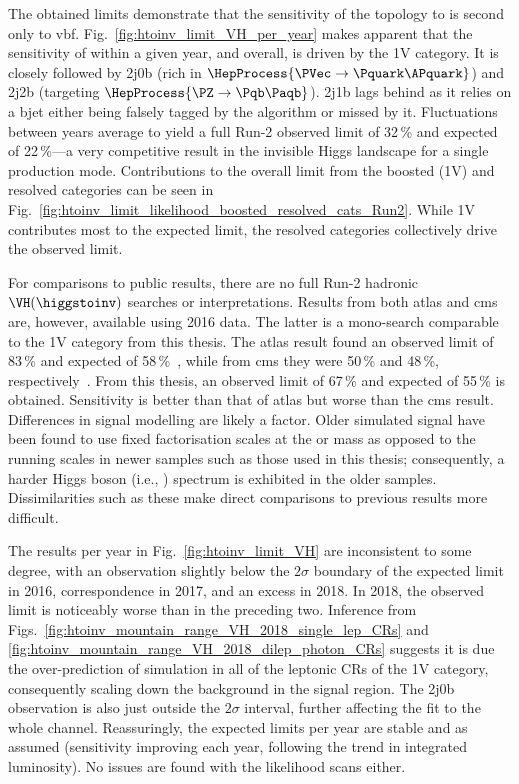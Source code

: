 The obtained limits demonstrate that the sensitivity of the \VH topology to \higgstoinv is second only to \acrshort{vbf}. Fig.~\ref{fig:htoinv_limit_VH_per_year} makes apparent that the sensitivity of \VH within a given year, and overall, is driven by the 1V category. It is closely followed by 2j0b (rich in $\HepProcess{\PVec \to \Pquark\APquark}$) and 2j2b (targeting $\HepProcess{\PZ \to \Pqb\Paqb}$). 2j1b lags behind as it relies on a \gls{bjet} either being falsely tagged by the \deepcsv algorithm or missed by it. Fluctuations between years average to yield a full Run-2 observed limit of 32\,\% and expected of 22\,\%---a very competitive result in the invisible Higgs landscape for a single production mode. Contributions to the overall limit from the boosted (1V) and resolved categories can be seen in Fig.~\ref{fig:htoinv_limit_likelihood_boosted_resolved_cats_Run2}. While 1V contributes most to the expected limit, the resolved categories collectively drive the observed limit.

For comparisons to public results, there are no full Run-2 hadronic $\VH(\higgstoinv)$ searches or interpretations. Results from both \acrshort{atlas} and \acrshort{cms} are, however, available using 2016 data. The latter is a mono-\PVec search comparable to the 1V category from this thesis. The \acrshort{atlas} \VH result found an observed limit of 83\,\% and expected of 58\,\%~\cite{Aaboud:2018xdl}, while from \acrshort{cms} they were 50\,\% and 48\,\%, respectively~\cite{Sirunyan:2017jix}. From this thesis, an observed limit of 67\,\% and expected of 55\,\% is obtained. Sensitivity is better than that of \acrshort{atlas} but worse than the \acrshort{cms} result. Differences in signal modelling are likely a factor. Older simulated signal have been found to use fixed factorisation scales at the \PW or \PH mass as opposed to the running scales in newer samples such as those used in this thesis; consequently, a harder Higgs boson \pt (i.e., \ptmiss) spectrum is exhibited in the older samples. Dissimilarities such as these make direct comparisons to previous results more difficult.


The results per year in Fig.~\ref{fig:htoinv_limit_VH} are inconsistent to some degree, with an observation slightly below the $\text{2}\sigma$ boundary of the expected limit in 2016, correspondence in 2017, and an excess in 2018. In 2018, the observed limit is noticeably worse than in the preceding two. Inference from Figs.~\ref{fig:htoinv_mountain_range_VH_2018_single_lep_CRs} and \ref{fig:htoinv_mountain_range_VH_2018_dilep_photon_CRs} suggests it is due the over-prediction of simulation in all of the leptonic \glspl{CR} of the 1V category, consequently scaling down the background in the signal region. The 2j0b observation is also just outside the $\text{2}\sigma$ interval, further affecting the fit to the whole channel. Reassuringly, the expected limits per year are stable and as assumed (sensitivity improving each year, following the trend in integrated luminosity). No issues are found with the likelihood scans either.

